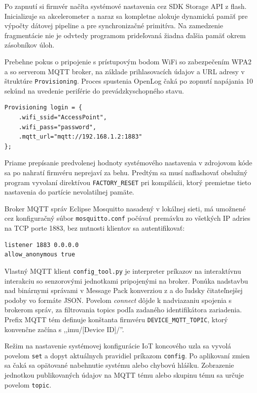 Po zapnutí si firmvér načíta systémové nastavenia cez SDK Storage API z flash. Inicializuje sa
akcelerometer a naraz sa kompletne alokuje dynamická pamäť pre výpočty dátovej pipeline a pre synchronizačné primitíva.
Na zamedzenie fragmentácie nie je odvtedy programom prideľovaná žiadna ďalšia pamäť okrem zásobníkov úloh.

Prebehne pokus o pripojenie s prístupovým bodom WiFi so zabezpečením WPA2 a so serverom MQTT broker, na základe prihlasovacích údajov
a URL adresy v štruktúre \verb|Provisioning|. Proces spustenia OpenLog čaká po zopnutí napájania 10 sekúnd na uvedenie
periférie do prevádzkyschopného stavu.
\begin{lstlisting}[style=implementation]
Provisioning login = {
    .wifi_ssid="AccessPoint",
    .wifi_pass="password",
    .mqtt_url="mqtt://192.168.1.2:1883"
};
\end{lstlisting}

Priame prepísanie predvolenej hodnoty systémového nastavenia v zdrojovom kóde
sa po nahratí firmvéru neprejaví za behu. Predtým sa musí naflashovať obslužný program vyvolaní direktívou
\verb|FACTORY_RESET| pri kompilácii, ktorý premietne tieto nastavenia do partície nevolatilnej pamäte.

Broker MQTT správ Eclipse Mosquitto nasadený v lokálnej sieti, má umožnené cez konfiguračný súbor \verb|mosquitto.conf| počúvať
premávku zo všetkých IP adries na TCP porte 1883, bez nutnosti klientov sa autentifikovať:
\begin{lstlisting}[style=implementation]
listener 1883 0.0.0.0
allow_anonymous true
\end{lstlisting}

Vlastný MQTT klient \verb|config_tool.py| je interpreter príkazov na interaktívnu interakciu so senzorovými jednotkami
pripojenými na broker. Ponúka nadstavbu nad binárnymi správami v Message Pack konverziou z a do ľudsky čitateľnejšej
podoby vo formáte JSON. Povelom \emph{connect} dôjde k nadviazaniu spojenia s brokerom správ, za filtrovania topics podľa
zadaného identifikátora zariadenia. Prefix MQTT tém definuje konštanta firmvéru \verb|DEVICE_MQTT_TOPIC|, ktorý konvenčne začína
s ,,imu/[Device ID]/''.

Režim na nastavenie systémovej konfigurácie IoT koncového uzla sa vyvolá povelom \verb|set| a dopyt aktuálnych pravidiel
príkazom \verb|config|. Po aplikovaní zmien sa čaká sa opätované nabehnutie systému alebo chybovú hlášku.
Zobrazenie jednotkou publikovaných údajov na MQTT tému alebo skupinu tému sa určuje povelom \verb|topic|.

